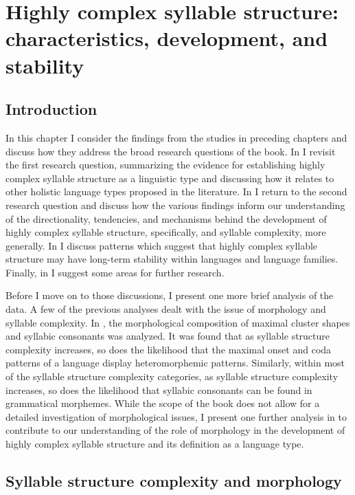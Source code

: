 \chapter{Highly complex syllable structure: characteristics, development, and stability}\label{sec:8}
\section{Introduction}\label{sec:8.1}

  In this chapter I consider the findings from the studies in preceding chapters and discuss how they address the broad research questions of the book. In  I revisit the first research question, summarizing the evidence for establishing highly complex syllable structure as a linguistic type and discussing how it relates to other holistic language types proposed in the literature. In  I return to the second research question and discuss how the various findings inform our understanding of the directionality, tendencies, and mechanisms behind the development of highly complex syllable structure, specifically, and syllable complexity, more generally. In  I discuss patterns which suggest that highly complex syllable structure may have long-term stability within languages and language families. Finally, in  I suggest some areas for further research.

  Before I move on to those discussions, I present one more brief analysis of the data. A few of the previous analyses dealt with the issue of morphology and syllable complexity. In  , the morphological composition of maximal cluster shapes and syllabic consonants was analyzed. It was found that as syllable structure complexity increases, so does the likelihood that the maximal onset and coda patterns of a language display heteromorphemic patterns. Similarly, within most of the syllable structure complexity categories, as syllable structure complexity increases, so does the likelihood that syllabic consonants can be found in grammatical morphemes. While the scope of the book does not allow for a detailed investigation of morphological issues, I present one further analysis in  to contribute to our understanding of the role of morphology in the development of highly complex syllable structure and its definition as a language type.

\section{Syllable structure complexity and morphology}\label{sec:8.2}

